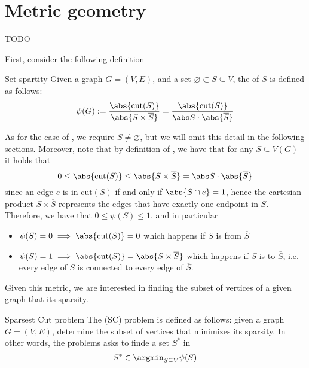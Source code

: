 \documentclass[a4paper, 12pt]{report}
\begin{document}
    \chapter{Metric geometry}

    TODO 

    First, consider the following definition

    \begin{frameddefn}{Set spartity}
        Given a graph $G = (V, E)$, and a set $\varnothing \subset S \subseteq V$, the  of $S$ is defined as follows: $$\psi (G) := \dfrac{\abs{\mathrm{cut}(S)}}{\abs{S \times \overline S}} = \dfrac{\abs{\mathrm{cut}(S)}}{\abs S \cdot \abs{\overline S}}$$
    \end{frameddefn}

    As for the case of , we require $S \neq \varnothing$, but we will omit this detail in the following sections. Moreover, note that by definition of , we have that for any $S \subseteq V(G)$ it holds that $$0 \le \abs{\mathrm{cut}(S)} \le \abs {S \times \overline S} = \abs S \cdot \abs{\overline S}$$ since an edge $e$ is in $\mathrm{cut}(S)$ if and only if $\abs {S \cap e} = 1$, hence the cartesian product $S \times \overline S$ represents the edges that have exactly one endpoint in $S$. Therefore, we have that $0 \le \psi(S) \le 1$, and in particular

    \begin{itemize}
        \item $\psi(S) = 0 \implies \abs{\mathrm{cut}(S)} = 0$ which happens if $S$ is  from $\overline S$
        \item $\psi(S) = 1 \implies \abs{\mathrm{cut}(S)} = \abs{S \times \overline S}$ which happens if $S$ is  to $\overline S$, i.e. every edge of $S$ is connected to every edge of $\overline S$.
    \end{itemize}

    Given this metric, we are interested in finding the subset of vertices of a given graph that  its sparsity.

    \begin{frameddefn}{Sparsest Cut problem}
        The  (SC) problem is defined as follows: given a graph $G = (V, E)$, determine the subset of vertices that minimizes its sparsity. In other words, the problems asks to finde a set $S^*$ in $$S^* \in \argmin_{S \subseteq V}{\psi(S)}$$
    \end{frameddefn}
\end{document}
